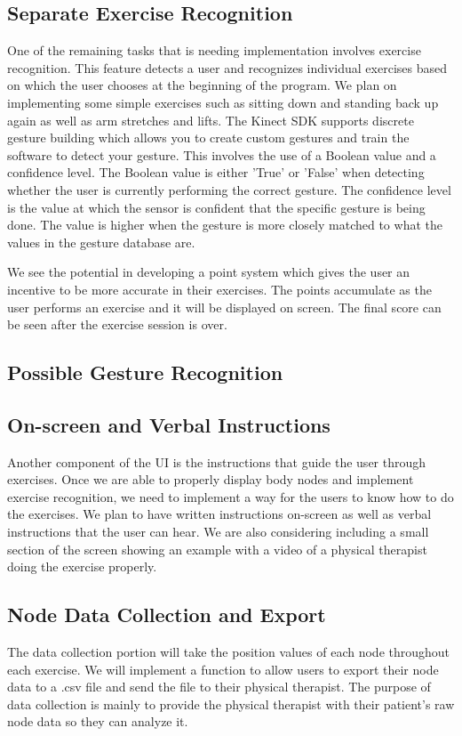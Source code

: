 \documentclass[onecolumn, draftclsnofoot,10pt, compsoc]{IEEEtran}
\begin{document}
\subsection{Separate Exercise Recognition}
One of the remaining tasks that is needing implementation involves exercise recognition. This feature detects a user and recognizes individual exercises based on which the user chooses at the beginning of the program. We plan on implementing some simple exercises such as sitting down and standing back up again as well as arm stretches and lifts. The Kinect SDK supports discrete gesture building which allows you to create custom gestures and train the software to detect your gesture. This involves the use of a Boolean value and a confidence level. The Boolean value is either 'True' or 'False' when detecting whether the user is currently performing the correct gesture. The confidence level is the value at which the sensor is confident that the specific gesture is being done. The value is higher when the gesture is more closely matched to what the values in the gesture database are.

We see the potential in developing a point system which gives the user an incentive to be more accurate in their exercises. The points accumulate as the user performs an exercise and it will be displayed on screen. The final score can be seen after the exercise session is over.

\subsection{Possible Gesture Recognition}

\subsection{On-screen and Verbal Instructions}
Another component of the UI is the instructions that guide the user through exercises. Once we are able to properly display body nodes and implement exercise recognition, we need to implement a way for the users to know how to do the exercises. We plan to have written instructions on-screen as well as verbal instructions that the user can hear. We are also considering including a small section of the screen showing an example with a video of a physical therapist doing the exercise properly.

\subsection{Node Data Collection and Export}
The data collection portion will take the position values of each node throughout each exercise. We will implement a function to allow users to export their node data to a .csv file and send the file to their physical therapist. The purpose of data collection is mainly to provide the physical therapist with their patient's raw node data so they can analyze it.
\end{document}
